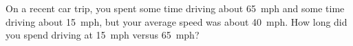 \documentclass{ximera}
\begin{document}
\begin{problem}
  On a recent car trip, you spent some time driving about 65~mph and
  some time driving about 15~mph, but your average speed was about
  40~mph.  How long did you spend driving at 15~mph versus 65~mph?
  \begin{multipleChoice}
  \end{multipleChoice}
\end{problem}
\end{document}
